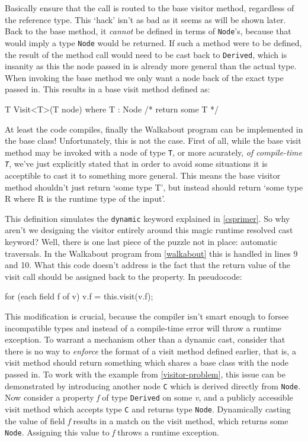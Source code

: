 \documentclass[twoside,openright]{uva-bachelor-thesis}
\newcommand{\code}[1]{\texttt{\footnotesize#1}}
\begin{document}
			Basically ensure that the call is routed to the base visitor method, regardless of the reference type. This `hack' isn't as bad as it seems as will be shown later. Back to the base method, it \emph{cannot} be defined in terms of \code{Node}'s, because that would imply a type \code{Node} would be returned. If such a method were to be defined, the result of the method call would need to be cast back to \code{Derived}, which is insanity as this the node passed in is already more general than the actual type. When invoking the base method we only want a node back of the exact type passed in. This results in a base visit method defined as:
			\begin{codespan}
				\begin{csharpcode}
					T Visit<T>(T node) where T : Node { /* return some T */ }
				\end{csharpcode}
			\end{codespan}
			
			At least the code compiles, finally the Walkabout program can be implemented in the base class! Unfortunately, this is not the case. First of all, while the base visit method may be invoked with a node of type \code{T}, or more acurately, \emph{of compile-time \code{T}}, we've just explicitly stated that in order to avoid some situations it is acceptible to cast it to something more general. This means the base visitor method shouldn't just return `some type T', but instead should return `some type R where R is the runtime type of the input'.
			
			This definition simulates the \code{dynamic} keyword explained in \cref{csprimer}. So why aren't we designing the visitor entirely around this magic runtime resolved cast keyword? Well, there is one last piece of the puzzle not in place: automatic traversals. In the Walkabout program from \cref{walkabout} this is handled in lines 9 and 10. What this code doesn't address is the fact that the return value of the visit call should be assigned back to the property. In pseudocode:
			\begin{codespan}
				\begin{csharpcode}
					for (each field f of v)
						v.f = this.visit(v.f);
				\end{csharpcode}
			\end{codespan}
			
			This modification is crucial, because the compiler isn't smart enough to forsee incompatible types and instead of a compile-time error will throw a runtime exception. To warrant a mechanism other than a dynamic cast, consider that there is no way to \emph{enforce} the format of a visit method defined earlier, that is, a visit method should return something which shares a base class with the node passed in. To work with the example from \cref{visitor-problem}, this issue can be demonstrated by introducing another node \code{C} which is derived directly from \code{Node}. Now consider a property \emph{f} of type \code{Derived} on some \emph{v}, and a publicly accessible visit method which accepts type \code{C} and returns type \code{Node}. Dynamically casting the value of field \emph{f} results in a match on the visit method, which returns some \code{Node}. Assigning this value to \emph{f} throws a runtime exception.
			
\end{document}
